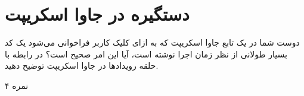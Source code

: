 \documentclass[../main.tex]{subfiles}
\begin{document}
\section{دستگیره در جاوا اسکریپت}

دوست شما در یک تابع جاوا اسکریپت که به ازای کلیک کاربر فراخوانی می‌شود یک کد بسیار طولانی از نظر زمان اجرا نوشته است، آیا این امر صحیح است؟ در رابطه با حلقه رویدادها در جاوا اسکریپت توضیح دهید.

۴ نمره
\end{document}
